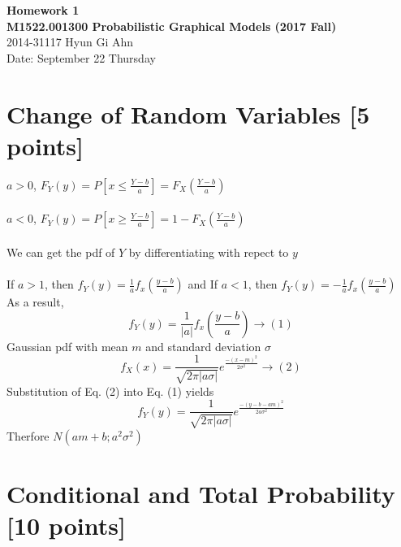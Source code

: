 \documentclass[12pt,a4paper]{article}
\begin{document}
\begin{center}
    {\bf\large Homework 1} \\
    {\bf\large M1522.001300 Probabilistic Graphical Models (2017 Fall)} \\
    2014-31117 Hyun Gi Ahn \\
    Date: September 22 Thursday
\end{center}

\section{Change of Random Variables [5 points]}

 $a > 0$,  ${F}_{Y}(y) = P\left[x\leq\frac{Y-b}{a}\right] = F_{X}\left(\frac{Y-b}{a}\right)$ \\
\\
 $a < 0$,  ${F}_{Y}(y) = P\left[x\geq\frac{Y-b}{a}\right] = 1-F_{X}\left(\frac{Y-b}{a}\right)$ \\
\\
We can get the pdf of $Y$ by differentiating with repect to $y$ \\
\\
If $a>1$, then ${f}_{Y}(y)=\frac{1}{a}{f}_{x}\left(\frac{y-b}{a}\right)$ and
If $a<1$, then ${f}_{Y}(y)=-\frac{1}{a}{f}_{x}\left(\frac{y-b}{a}\right)$ \\
As a result, $${f}_{Y}(y)={\frac{1}{\left|a\right|}}{f}_{x}\left(\frac{y-b}{a}\right)\xrightarrow{}(1)$$
Gaussian pdf with mean $m$ and standard deviation $\sigma$
$${f}_{X}(x)=\frac{1}{\sqrt{2\pi\left|a\sigma\right|}}{e}^{\frac{-(x-m)^2}{2\sigma^2}}\xrightarrow{}(2)$$
Substitution of Eq. (2) into Eq. (1) yields
$${f}_{Y}(y)=\frac{1}{\sqrt{2\pi\left|a\sigma\right|}}{e}^{\frac{-(y-b-am)^2}{2a\sigma^2}}$$
Therfore $N(am+b;a^2\sigma^2)$
\section{Conditional and Total Probability [10 points]}
\end{document}
